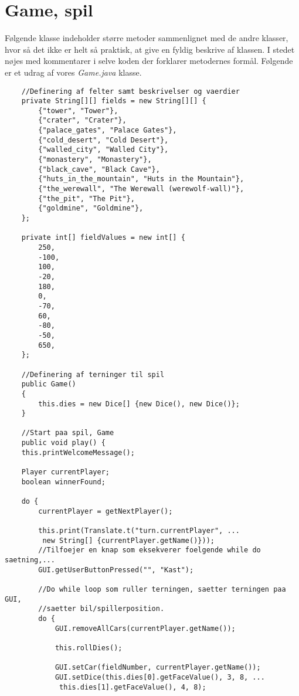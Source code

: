 \section{Game, spil}
\noindent Følgende klasse indeholder større metoder sammenlignet med de andre klasser, hvor så det ikke er helt så praktisk, at give en fyldig beskrive af klassen.
I stedet nøjes med kommentarer i selve koden der forklarer metodernes formål.
Følgende er et udrag af vores \textit{Game.java} klasse.\\
\begin{lstlisting}
    //Definering af felter samt beskrivelser og vaerdier
    private String[][] fields = new String[][] {
        {"tower", "Tower"},
        {"crater", "Crater"},
        {"palace_gates", "Palace Gates"},
        {"cold_desert", "Cold Desert"},
        {"walled_city", "Walled City"},
        {"monastery", "Monastery"},
        {"black_cave", "Black Cave"},
        {"huts_in_the_mountain", "Huts in the Mountain"},
        {"the_werewall", "The Werewall (werewolf-wall)"},
        {"the_pit", "The Pit"},
        {"goldmine", "Goldmine"},
    };

    private int[] fieldValues = new int[] {
        250,
        -100,
        100,
        -20,
        180,
        0,
        -70,
        60,
        -80,
        -50,
        650,
    };

    //Definering af terninger til spil
    public Game()
    {
        this.dies = new Dice[] {new Dice(), new Dice()};
    }

    //Start paa spil, Game
    public void play() {
    this.printWelcomeMessage();

    Player currentPlayer;
    boolean winnerFound;

    do {
        currentPlayer = getNextPlayer();

        this.print(Translate.t("turn.currentPlayer", ...
         new String[] {currentPlayer.getName()}));
        //Tilfoejer en knap som eksekverer foelgende while do saetning,...
        GUI.getUserButtonPressed("", "Kast");
        
        //Do while loop som ruller terningen, saetter terningen paa GUI,
        //saetter bil/spillerposition.
        do {
            GUI.removeAllCars(currentPlayer.getName());

            this.rollDies();

            GUI.setCar(fieldNumber, currentPlayer.getName());
            GUI.setDice(this.dies[0].getFaceValue(), 3, 8, ...
             this.dies[1].getFaceValue(), 4, 8);


\end{lstlisting}
